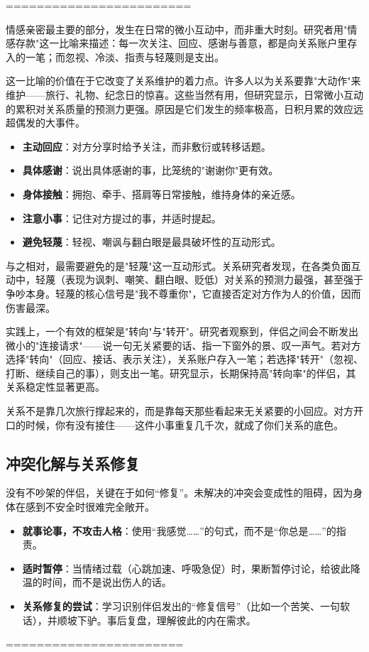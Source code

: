 \documentclass[12pt,UTF8]{ctexbook}
\newcommand{\keyword}[1]{\textbf{#1}}
\begin{document}
========================

情感亲密最主要的部分，发生在日常的微小互动中，而非重大时刻。研究者用"情感存款"这一比喻来描述：每一次关注、回应、感谢与善意，都是向关系账户里存入的一笔；而忽视、冷淡、指责与轻蔑则是支出。

这一比喻的价值在于它改变了关系维护的着力点。许多人以为关系要靠"大动作"来维护——旅行、礼物、纪念日的惊喜。这些当然有用，但研究显示，日常微小互动的累积对关系质量的预测力更强。原因是它们发生的频率极高，日积月累的效应远超偶发的大事件。

\begin{itemize}
  \item \keyword{主动回应}：对方分享时给予关注，而非敷衍或转移话题。
  \item \keyword{具体感谢}：说出具体感谢的事，比笼统的"谢谢你"更有效。
  \item \keyword{身体接触}：拥抱、牵手、搭肩等日常接触，维持身体的亲近感。
  \item \keyword{注意小事}：记住对方提过的事，并适时提起。
  \item \keyword{避免轻蔑}：轻视、嘲讽与翻白眼是最具破坏性的互动形式。
\end{itemize}

与之相对，最需要避免的是"轻蔑"这一互动形式。关系研究者发现，在各类负面互动中，轻蔑（表现为讽刺、嘲笑、翻白眼、贬低）对关系的预测力最强，甚至强于争吵本身。轻蔑的核心信号是"我不尊重你"，它直接否定对方作为人的价值，因而伤害最深。

实践上，一个有效的框架是"转向"与"转开"。研究者观察到，伴侣之间会不断发出微小的"连接请求"——说一句无关紧要的话、指一下窗外的景、叹一声气。若对方选择"转向"（回应、接话、表示关注），关系账户存入一笔；若选择"转开"（忽视、打断、继续自己的事），则支出一笔。研究显示，长期保持高"转向率"的伴侣，其关系稳定性显著更高。

\begin{tcolorbox}[colback=pink!5!white,colframe=red!50!black,title=贴心小叮咛]
关系不是靠几次旅行撑起来的，而是靠每天那些看起来无关紧要的小回应。对方开口的时候，你有没有接住——这件小事重复几千次，就成了你们关系的底色。
\end{tcolorbox}


\subsection{冲突化解与关系修复}

没有不吵架的伴侣，关键在于如何“修复”。未解决的冲突会变成性的阻碍，因为身体在感到不安全时很难完全敞开。
\begin{itemize}
	\item \textbf{就事论事，不攻击人格}：使用“我感觉……”的句式，而不是“你总是……”的指责。
	\item \textbf{适时暂停}：当情绪过载（心跳加速、呼吸急促）时，果断暂停讨论，给彼此降温的时间，而不是说出伤人的话。
	\item \textbf{关系修复的尝试}：学习识别伴侣发出的“修复信号”（比如一个苦笑、一句软话），并顺坡下驴。事后复盘，理解彼此的内在需求。
\end{itemize}
=======================
\end{document}
